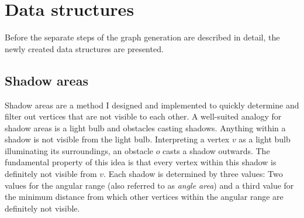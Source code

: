 \section{Data structures}
	
	Before the separate steps of the graph generation are described in detail, the newly created data structures are presented.
		
	\subsection{Shadow areas}
	\label{subsec:shadow-areas}
		
		Shadow areas are a method I designed and implemented to quickly determine and filter out vertices that are not visible to each other.
		A well-suited analogy for shadow areas is a light bulb and obstacles casting shadows.
		Anything within a shadow is not visible from the light bulb.
		Interpreting a vertex $v$ as a light bulb illuminating its surroundings, an obstacle $o$ casts a shadow outwards.
		The fundamental property of this idea is that every vertex within this shadow is definitely not visible from $v$.
		Each shadow is determined by three values:
		Two values for the angular range (also referred to as \emph{angle area}) and a third value for the minimum distance from which other vertices within the angular range are definitely not visible.
		
